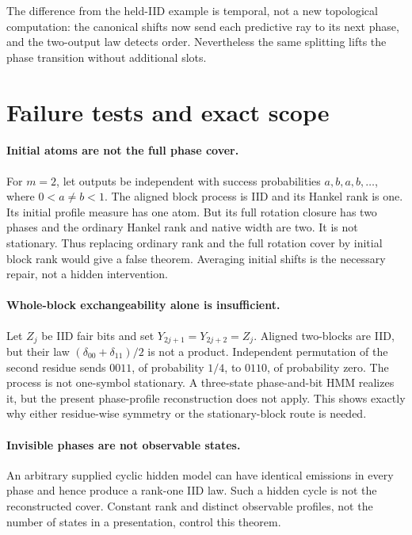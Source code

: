 \documentclass[11pt]{article}
\theoremstyle{remark}\newtheorem{remark}[theorem]{Remark}
\begin{document}
The difference from the held-IID example is temporal, not a new topological computation: the canonical shifts now send each predictive ray to its next phase, and the two-output law detects order. Nevertheless the same splitting lifts the phase transition without additional slots.

\section{Failure tests and exact scope}
\paragraph{Initial atoms are not the full phase cover.}
For $m=2$, let outputs be independent with success probabilities $a,b,a,b,\ldots$, where $0<a\ne b<1$. The aligned block process is IID and its Hankel rank is one. Its initial profile measure has one atom. But its full rotation closure has two phases and the ordinary Hankel rank and native width are two. It is not stationary. Thus replacing ordinary rank and the full rotation cover by initial block rank would give a false theorem. Averaging initial shifts is the necessary repair, not a hidden intervention.

\paragraph{Whole-block exchangeability alone is insufficient.}
Let $Z_j$ be IID fair bits and set $Y_{2j+1}=Y_{2j+2}=Z_j$. Aligned two-blocks are IID, but their law $(\delta_{00}+\delta_{11})/2$ is not a product. Independent permutation of the second residue sends $0011$, of probability $1/4$, to $0110$, of probability zero. The process is not one-symbol stationary. A three-state phase-and-bit HMM realizes it, but the present phase-profile reconstruction does not apply. This shows exactly why either residue-wise symmetry or the stationary-block route is needed.

\paragraph{Invisible phases are not observable states.}
An arbitrary supplied cyclic hidden model can have identical emissions in every phase and hence produce a rank-one IID law. Such a hidden cycle is not the reconstructed cover. Constant rank and distinct observable profiles, not the number of states in a presentation, control this theorem.
\end{document}
